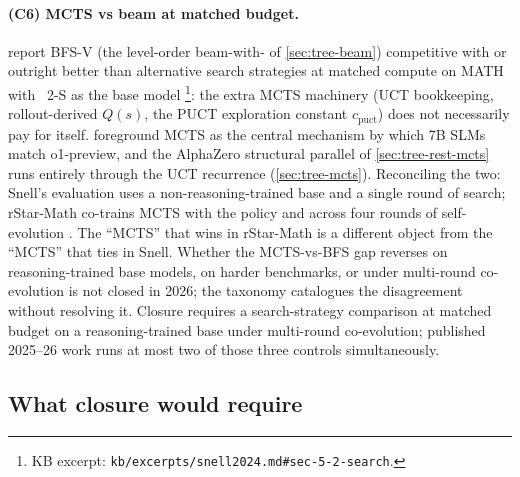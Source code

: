 \paragraph{(C6) MCTS vs beam at matched budget.}
 report BFS-V (the level-order beam-with-
of \cref{sec:tree-beam}) competitive with or outright better than
alternative search strategies at matched compute on MATH with
~2-S\* as the base model
\citep[\S 5.2]{snell2024}\footnote{KB excerpt:
\texttt{kb/excerpts/snell2024.md\#sec-5-2-search}.}: the extra MCTS
machinery (UCT bookkeeping, rollout-derived $Q(s)$, the PUCT
exploration constant $c_\text{puct}$) does not necessarily pay for
itself.  foreground MCTS as the central
mechanism by which 7B SLMs match o1-preview, and the AlphaZero
structural parallel of \cref{sec:tree-rest-mcts} runs entirely through
the UCT recurrence (\cref{sec:tree-mcts}). Reconciling the two: Snell's
evaluation uses a non-reasoning-trained base and a single round of
search; rStar-Math co-trains MCTS with the policy and  across four
rounds of self-evolution \citep[abstract]{rstar-math2025}. The
``MCTS'' that wins in rStar-Math is a different object from the
``MCTS'' that ties in Snell. Whether the MCTS-vs-BFS gap reverses on
reasoning-trained base models, on harder benchmarks, or under
multi-round co-evolution is not closed in 2026; the
\citet{wei2025-tree-search-survey} taxonomy catalogues the
disagreement without resolving
it. Closure requires a search-strategy comparison
at matched budget on a reasoning-trained base under multi-round
co-evolution; published 2025--26 work runs at most two of those three
controls simultaneously.

\subsection{What closure would require}
\label{sec:contradictions-closure}

